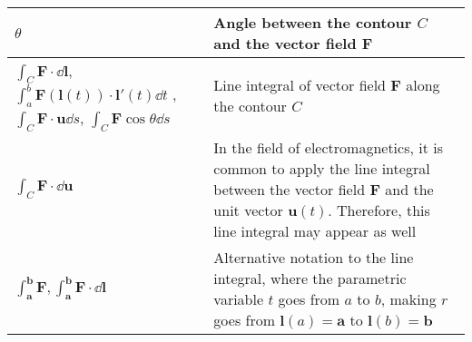 \begin{xltabular}{\textwidth}{XX}
	\(\theta\) \cite{ramoFieldsWavesCommunication1994}                                                                                                                                                                                                                                                 & Angle between the contour \(C\) and the vector field \(\mathbf{F}\)                                                                                                                                                                                                                                                                 \\ \hline
	\(\int_C \mathbf{F}\cdot\dd{\mathbf{l}}\), \(\int_a^b \mathbf{F}(\mathbf{l}(t)) \cdot \mathbf{l}'(t) \dd{t}\) \cite{apostolCalculus2ndEdn1967,stewartCalculus2011}, \(\int_C \mathbf{F}\cdot\mathbf{u} \dd{s}\), \(\int_C \mathbf{F} \cos{\theta} \dd{s}\) \cite{ramoFieldsWavesCommunication1994} & Line integral of vector field \(\mathbf{F}\) along the contour \(C\)                                                                                                                                                                                                                                                                \\ \hline
	\(\int_C \mathbf{F}\cdot\dd{\mathbf{u}}\) \cite{ramoFieldsWavesCommunication1994}                                                                                                                                                                                                                  & In the field of electromagnetics, it is common to apply the line integral between the vector field \(\mathbf{F}\) and the unit vector \(\mathbf{u}(t)\). Therefore, this line integral may appear as well                                                                                                                           \\ \hline
	\(\int_\mathbf{a}^\mathbf{b} \mathbf{F}, \int_\mathbf{a}^\mathbf{b} \mathbf{F}\cdot\dd{\mathbf{l}}\)                                                                                                                                                                                               & Alternative notation to the line integral, where the parametric variable \(t\) goes from \(a\) to \(b\), making \(r\) goes from \(\mathbf{l}(a) = \mathbf{a}\) to \(\mathbf{l}(b) = \mathbf{b}\) \cite{apostolCalculus2ndEdn1967}                                                                                                   \\ \hline

\end{xltabular}
